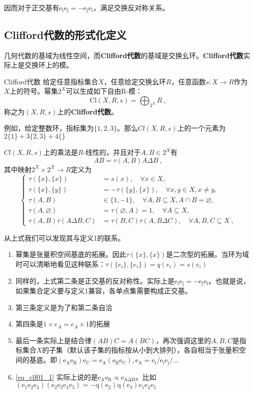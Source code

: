 因而对于正交基有$\mathrm{e_ie_j=-e_je_i}$，满足交换反对称关系。

\subsection{Clifford代数的形式化定义}
几何代数的基域为线性空间，而\textbf{Clifford代数}的基域是交换幺环。\textbf{Clifford代数}实际上是交换环上的模。
\begin{definition}{Clifford代数}
给定任意指标集合$X$，任意给定交换幺环$R$，任意函数$s:X\rightarrow {R}$作为$X$上的符号。幂集$2^X$可以生成如下自由R-模：
\begin{equation}
\mathrm{Cl}(X,R,s)=\bigoplus_{2^X}R~,
\end{equation}
称之为$(X,R,s)$上的\textbf{Clifford代数}。
\end{definition}

例如，给定整数环，指标集为$\{1,2,3\}$。那么$Cl(X,R,s)$上的一个元素为$2\{1\}+3\{2,3\}+4\{\}$


$Cl(X,R,s)$上的乘法是$R$-线性的，并且对于$A,B\in 2^X$有
\begin{equation}\label{eq_clf01_1}
AB=\tau(A,B)A\Delta B~,
\end{equation}
其中映射$2^X \times 2^X \rightarrow R$定义为
\begin{equation}
\left\{\begin{aligned}
\tau(\{x\},\{x\}) & =s(x), \quad \forall x \in X, \\
\tau(\{x\},\{y\}) & =-\tau(\{y\},\{x\}), \quad \forall x, y \in X, x \neq y, \\
\tau(A, B) & \in\{1,-1\}, \quad \forall A, B \subseteq X, A \cap B=\varnothing, \\
\tau(A, \varnothing) & =\tau(\varnothing, A)=1, \quad \forall A \subseteq X, \\
\tau(A, B) \tau(A \Delta B, C) & =\tau(B, C) \tau(A, B \Delta C), \quad \forall A, B, C \subseteq X~,
\end{aligned}\right.
\end{equation}


从上式我们可以发现其与定义1的联系。
\begin{enumerate}
\item 幂集是张量积空间基底的拓展。因此$\tau(\{x\},\{x\})$是二次型的拓展。当环为域时可以清晰地看见这种联系：$\tau(\{e_i\},\{e_i\})=q(e_i)=s(e_i)$
\item 同样的，上式第二条是正交基的反对称性。实际上是$\mathrm {e_ie_j=-e_je_i}$。也就是说，如果集合定义要与定义1兼容，各单点集需要构成正交基。
\item 第三条定义是为了和第二条自洽
\item 第四条是$1\times e_A=e_A\times 1$的拓展
\item 最后一条实际上是结合律$(AB)C=A(BC)$，再次强调这里的$A,B,C$是指标集合$X$的子集（默认该子集的指标按从小到大排列），各自相当于张量积空间的基底。即$\mathrm {(e_Ae_B)e_C=e_A(e_Be_C),e_A=e_i/e_ie_j/...}$
\item \autoref{eq_clf01_1} 实际上说的是$\mathrm {e_A e_B\propto e_{A\Delta B}}$。比如$\mathrm {(e_{1}e_{2}e_{3})(e_{2}e_{3}e_{4}e_{5})=-q(e_2)q(e_3)e_1 e_4 e_5}$
\end{enumerate}

